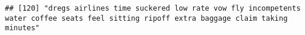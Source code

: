 \documentclass[
]{article}
\begin{document}
\begin{verbatim}
## [120] "dregs airlines time suckered low rate vow fly incompetents water coffee seats feel sitting ripoff extra baggage claim taking minutes"                                                                                                                                                                                                                                                                                                                                                                                                                                                                                                                                                                                                                                                                                                                                                                                                                                                                                                                                                                                                                                                                                                                                                                                                                                                                                                                                                                                                                                                                                                                                                                                                                                                          

\end{verbatim}
\end{document}
